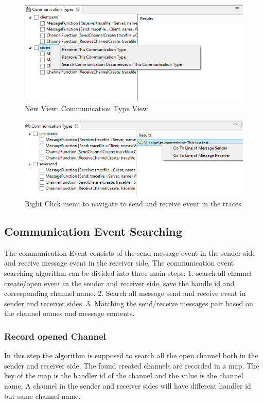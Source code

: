 \documentclass[paper=a4, fontsize=11pt]{scrartcl}
\numberwithin{equation}{section}		%
\numberwithin{figure}{section}			%
\numberwithin{table}{section}				%
\begin{document}
\begin{figure}[h]
\includegraphics[scale=.9]{CommunicationTypeview}
 \caption{New View: Communication Type View}
\label{CommunicationTypeview}
\end{figure}

\begin{figure}[h]
\includegraphics[scale=.9]{searchresult}
 \caption{Right Click menu to navigate to send and receive event in the traces}
\label{searchresult}
\end{figure}

\subsection{Communication Event Searching}
The communication Event consists of the send message event in the sender side and receive message event in the receiver side. The communication event searching algorithm can be divided into three main steps: 1. search all channel create/open event in the sender and receiver side, save the handle id and corresponding channel name. 2. Search all message send and receive event in sender and receiver sides. 3. Matching the send/receive messages pair based on the channel names and message contents.
\subsubsection{Record opened Channel}
In this step the algorithm is supposed to search all the open channel both in the sender and receiver side. The found created channels are recorded in a map. The key of the map is the handler id of the channel and the value is the channel name. A channel in the sender and receiver sides will have different handler id but same channel name.
\end{document}
